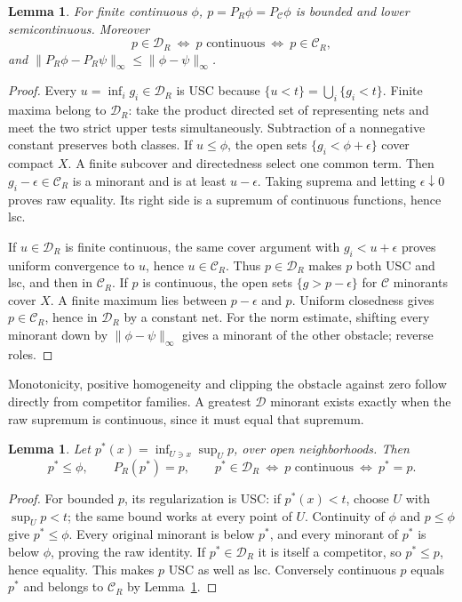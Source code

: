 \documentclass[11pt]{article}
\newtheorem{lemma}[theorem]{Lemma}
\newcommand{\C}{\mathcal C}
\newcommand{\D}{\mathcal D}
\begin{document}
\begin{lemma}\label{raw}
For finite continuous $\phi$, $p=P_R\phi=P_{\C}\phi$ is bounded and lower
semicontinuous. Moreover
\[
 p\in\D_R\ \Longleftrightarrow\ p\text{ continuous}
 \ \Longleftrightarrow\ p\in\C_R,
\]
and $\|P_R\phi-P_R\psi\|_\infty\le\|\phi-\psi\|_\infty$.
\end{lemma}
\begin{proof}
Every $u=\inf_i g_i\in\D_R$ is USC because $\{u<t\}=\bigcup_i\{g_i<t\}$.
Finite maxima belong to $\D_R$: take the product directed set of representing
nets and meet the two strict upper tests simultaneously. Subtraction of a
nonnegative constant preserves both classes.
If $u\le\phi$, the open sets $\{g_i<\phi+\epsilon\}$ cover compact $X$.
A finite subcover and directedness select one common term. Then
$g_i-\epsilon\in\C_R$ is a minorant and is at least $u-\epsilon$.
Taking suprema and letting $\epsilon\downarrow0$ proves raw equality.
Its right side is a supremum of continuous functions, hence lsc.

If $u\in\D_R$ is finite continuous, the same cover argument with
$g_i<u+\epsilon$ proves uniform convergence to $u$, hence $u\in\C_R$.
Thus $p\in\D_R$ makes $p$ both USC and lsc, and then in $\C_R$.
If $p$ is continuous, the open sets $\{g>p-\epsilon\}$ for $\C$ minorants
cover $X$. A finite maximum lies between $p-\epsilon$ and $p$.
Uniform closedness gives $p\in\C_R$, hence in $\D_R$ by a constant net.
For the norm estimate, shifting every minorant down by
$\|\phi-\psi\|_\infty$ gives a minorant of the other obstacle; reverse roles.
\end{proof}

Monotonicity, positive homogeneity and clipping the obstacle against zero
follow directly from competitor families. A greatest $\D$ minorant exists
exactly when the raw supremum is continuous, since it must equal that supremum.

\begin{lemma}\label{reg}
Let $p^*(x)=\inf_{U\ni x}\sup_U p$, over open neighborhoods. Then
\[
 p^*\le\phi,\qquad P_R(p^*)=p,\qquad
 p^*\in\D_R\ \Longleftrightarrow\ p\text{ continuous}
 \ \Longleftrightarrow\ p^*=p.
\]
\end{lemma}
\begin{proof}
For bounded $p$, its regularization is USC: if $p^*(x)<t$, choose $U$ with
$\sup_U p<t$; the same bound works at every point of $U$.
Continuity of $\phi$ and $p\le\phi$ give $p^*\le\phi$.
Every original minorant is below $p^*$, and every minorant of $p^*$ is below
$\phi$, proving the raw identity. If $p^*\in\D_R$ it is itself a competitor,
so $p^*\le p$, hence equality. This makes $p$ USC as well as lsc.
Conversely continuous $p$ equals $p^*$ and belongs to $\C_R$ by Lemma~\ref{raw}.
\end{proof}
\end{document}
